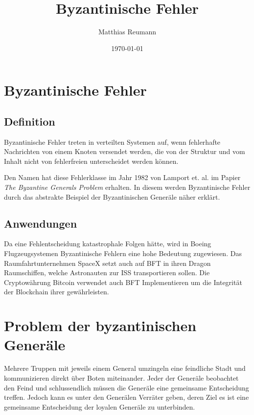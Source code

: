 \documentclass{article}
\title{Byzantinische Fehler}
\author{Matthias Reumann}
\date{\today}
\begin{document}
\maketitle

\newpage

\tableofcontents

\newpage

\section{Byzantinische Fehler}

\subsection{Definition}

Byzantinische Fehler treten in verteilten Systemen auf, 
wenn fehlerhafte Nachrichten von einem Knoten versendet werden, 
die von der Struktur und vom Inhalt nicht von fehlerfreien
unterscheidet werden können. \cite{esraberlin} 

\medskip 

Den Namen hat diese Fehlerklasse im Jahr 1982 von Lamport et. al. im 
Papier \textit{The Byzantine Generals Problem} erhalten.\cite{generals}
In diesem werden Byzantinische Fehler durch das abstrakte Beispiel der Byzantinischen Generäle näher erklärt.

\subsection{Anwendungen}
Da eine Fehlentscheidung katastrophale Folgen hätte, wird in Boeing Flugzeugsystemen 
Byzantinische Fehlern eine hohe Bedeutung zugewiesen.
Das Raumfahrtunternehmen SpaceX setzt auch auf BFT in ihren Dragon Raumschiffen, 
welche Astronauten zur ISS transportieren sollen. 
Die Cryptowährung Bitcoin verwendet auch BFT Implementieren um die Integrität 
der Blockchain ihrer gewährleisten. 

\section{Problem der byzantinischen Generäle}
\label{sec:generals}

Mehrere Truppen mit jeweils einem General umzingeln eine feindliche Stadt und 
kommunizieren direkt über Boten miteinander. 
Jeder der Generäle beobachtet den Feind und schlussendlich müssen die Generäle 
eine gemeinsame Entscheidung treffen. Jedoch kann es unter den Generälen Verräter geben,
deren Ziel es ist eine gemeinsame Entscheidung der loyalen Generäle zu unterbinden. 
\end{document}
